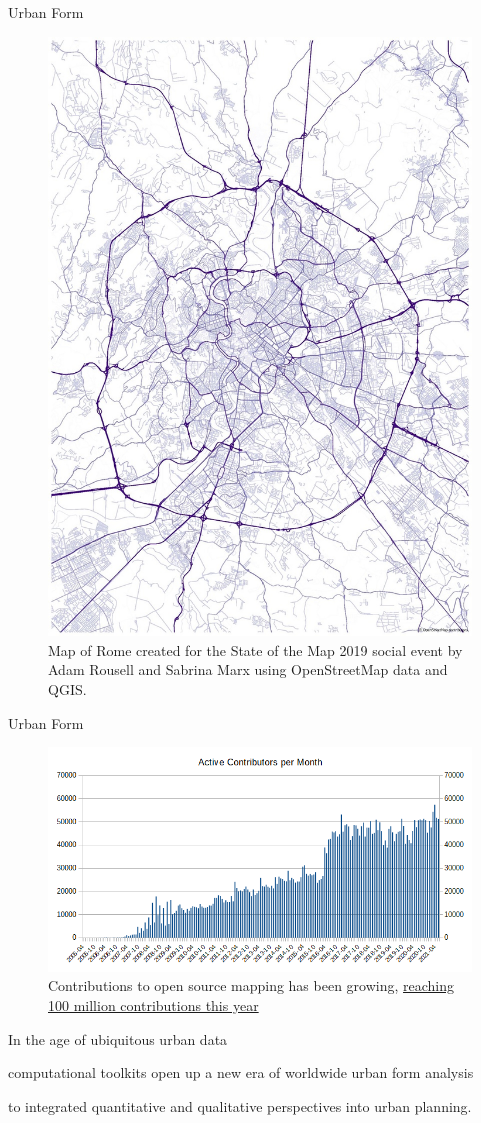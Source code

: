 \documentclass{beamer}
\begin{document}

\begin{frame}{Urban Form}
\begin{figure}
\includegraphics[height=0.5\textwidth]{images/osm_map_rome.jpg}
\caption{Map of Rome created for the State of the Map 2019 social event by Adam Rousell and Sabrina Marx using OpenStreetMap data and QGIS.}
\end{figure}
\end{frame}



\begin{frame}{Urban Form}
\begin{figure}
\includegraphics[height=0.5\textwidth]{images/osm_contributors_month.png}
\caption{Contributions to open source mapping has been growing, \href{https://blog.openstreetmap.org/2021/02/25/100-million-edits-to-openstreetmap/}{reaching 100 million contributions this year}}
\end{figure}
\end{frame}

\begin{frame}
In the age of ubiquitous urban data \pause

computational toolkits open up a new era of worldwide
urban form analysis \pause

to integrated quantitative and qualitative perspectives into urban planning.
\end{frame}
\end{document}
